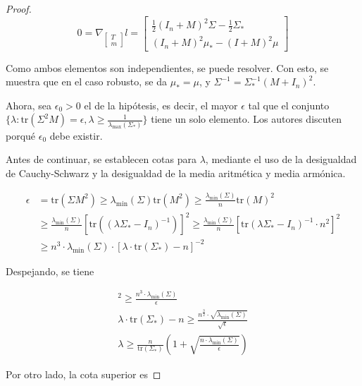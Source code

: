 \begin{itemize}
\begin{proof}
$$0=\nabla_{\begin{bmatrix}
    T \\
    m
\end{bmatrix}} l = \begin{bmatrix}
\frac{1}{2}(I_n + M)^2 \Sigma - \frac{1}{2} \Sigma_* \\
(I_n + M)^2 \mu_* - (I+M)^2 \mu
\end{bmatrix}
$$

Como ambos elementos son independientes, se puede resolver. Con esto, se muestra que en el caso robusto, se da $\mu_* = \mu$, y $\Sigma^{-1} = \Sigma_*^{-1} (M+I_n)^2$.

Ahora, sea $\epsilon_0>0$ el de la hipótesis, es decir, el mayor $\epsilon$ tal que el conjunto $\{\lambda: \text{tr}(\Sigma^2 M) = \epsilon, \lambda \geq \frac{1}{\lambda_{\text{max}}(\Sigma_*)}\}$ tiene un solo elemento. Los autores discuten porqué $\epsilon_0$ debe existir.

Antes de continuar, se establecen cotas para $\lambda$, mediante el uso de la desigualdad de Cauchy-Schwarz y la desigualdad de la media aritmética y media armónica.

\begin{align*}
\epsilon &= \text{tr}(\Sigma M^2) \geq \lambda_{\text{min}}(\Sigma) \text{tr}(M^2) \geq \frac{\lambda_{\text{min}}(\Sigma)}{n} \text{tr}(M)^2 \\
&\geq \frac{\lambda_{\text{min}}(\Sigma)}{n} \left[ \text{tr} \left( (\lambda \Sigma_* - I_n)^{-1} \right) \right]^2 \geq \frac{\lambda_{\text{min}}(\Sigma)}{n} \left[ \text{tr}(\lambda \Sigma_* - I_n)^{-1} \cdot n^2 \right]^2 \\
&\geq n^3 \cdot \lambda_{\text{min}}(\Sigma) \cdot [\lambda \cdot \text{tr}(\Sigma_*) - n]^{-2}
\end{align*}

Despejando, se tiene

\begin{align*}
[\lambda \cdot \text{tr}(\Sigma_*) - n]^2 \geq \frac{n^3 \cdot \lambda_{\text{min}}(\Sigma)}{\epsilon} \\
\lambda \cdot \text{tr}(\Sigma_*)-n \geq \frac{n^{\frac{3}{2}} \cdot \sqrt{\lambda_{\text{min}}(\Sigma)}}{\sqrt{\epsilon}} \\
\lambda \geq \frac{n}{\text{tr}(\Sigma_*)} \left( 1 + \sqrt{\frac{n \cdot \lambda_{\text{min}}(\Sigma)}{\epsilon}} \right)
\end{align*}

Por otro lado, la cota superior es


\end{proof}
\end{itemize}
